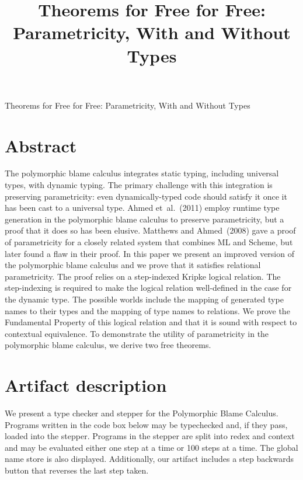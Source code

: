 \documentclass[11pt,numbers,nocopyrightspace,acmlarge,anonymous]{acmart}
\begin{document}
\setlength{\pdfpageheight}{\paperheight}
\setlength{\pdfpagewidth}{\paperwidth}



\title{Theorems for Free for Free: Parametricity, With and Without Types}
\subtitle{\vspace{-3cm}} %
          \onecolumn
          \begin{centering}
            \LARGE{Theorems for Free for Free: Parametricity, With and Without Types}
          \end{centering}
          \vspace{1cm}

\section{Abstract}
The polymorphic blame calculus integrates static typing, including
universal types, with dynamic typing. The primary challenge with this
integration is preserving parametricity: even dynamically-typed code
should satisfy it once it has been cast to a universal type.  Ahmed
et~al.~(2011) employ runtime type generation in the polymorphic blame
calculus to preserve parametricity, but a proof that it does so has
been elusive.  Matthews and Ahmed~(2008) gave a proof of parametricity
for a closely related system that combines ML and Scheme, but later
found a flaw in their proof.
%
In this paper we present an improved version of the polymorphic blame
calculus and we prove that it satisfies relational parametricity. The
proof relies on a step-indexed Kripke logical relation. The
step-indexing is required to make the logical relation well-defined in
the case for the dynamic type. The possible worlds include the mapping
of generated type names to their types and the mapping of type names
to relations. We prove the Fundamental Property of this logical
relation and that it is sound with respect to contextual equivalence.
%
To demonstrate the utility of parametricity in the polymorphic blame
calculus, we derive two free theorems.

\section{Artifact description}
We present a type checker and stepper for the Polymorphic Blame Calculus.
Programs written in the code box below may be typechecked and, if they pass,
loaded into the stepper. Programs in the stepper are split into redex and context
and may be evaluated either one step at a time or 100 steps at a time.
The global name store is also displayed.
Additionally, our artifact includes a step backwards button that reverses the last step taken.
\end{document}

